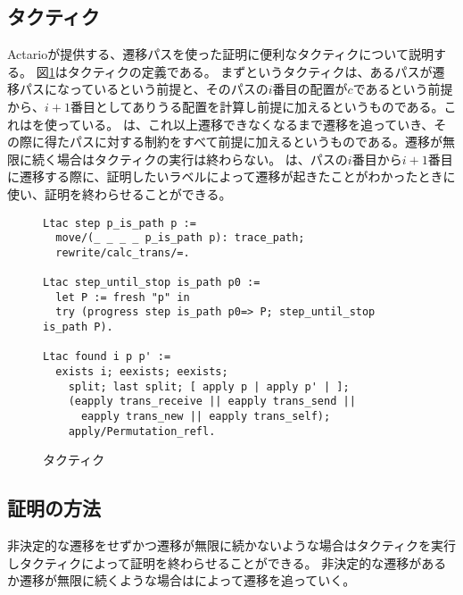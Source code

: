 \subsection{タクティク}

Actarioが提供する、遷移パスを使った証明に便利なタクティクについて説明する。
図\ref{code:proof:tactics}はタクティクの定義である。
まずというタクティクは、あるパスが遷移パスになっているという前提と、そのパスの$i$番目の配置が$c$であるという前提から、$i + 1$番目としてありうる配置を計算し前提に加えるというものである。これはを使っている。
は、これ以上遷移できなくなるまで遷移を追っていき、その際に得たパスに対する制約をすべて前提に加えるというものである。遷移が無限に続く場合はタクティクの実行は終わらない。
は、パスの$i$番目から$i + 1$番目に遷移する際に、証明したいラベルによって遷移が起きたことがわかったときに使い、証明を終わらせることができる。

\begin{figure}
\begin{lstlisting}
Ltac step p_is_path p :=
  move/(_ _ _ _ p_is_path p): trace_path;
  rewrite/calc_trans/=.

Ltac step_until_stop is_path p0 :=
  let P := fresh "p" in
  try (progress step is_path p0=> P; step_until_stop is_path P).

Ltac found i p p' :=
  exists i; eexists; eexists;
    split; last split; [ apply p | apply p' | ];
    (eapply trans_receive || eapply trans_send ||
      eapply trans_new || eapply trans_self);
    apply/Permutation_refl.
\end{lstlisting}
\label{code:proof:tactics}
\caption{タクティク}
\end{figure}

\subsection{証明の方法}

非決定的な遷移をせずかつ遷移が無限に続かないような場合はタクティクを実行しタクティクによって証明を終わらせることができる。
非決定的な遷移があるか遷移が無限に続くような場合はによって遷移を追っていく。
